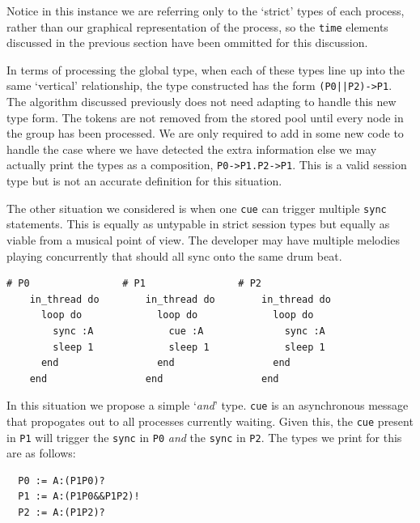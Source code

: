 \documentclass[11pt, abstracton, twoside, titlepage=true]{scrartcl}
\begin{document}
Notice in this instance we are referring only to the `strict' types of each 
process, rather than our graphical representation of the process, so the
\texttt{time} elements discussed in the previous section have been ommitted 
for this discussion.

In terms of processing the global type, when each of these types line up
into the same `vertical' relationship, the type constructed has the form 
\texttt{(P0||P2)->P1}. The algorithm discussed previously does not need
adapting to handle this new type form. The tokens are not removed from the
stored pool until every node in the group has been processed. We are only
required to add in some new code to handle the case where we have detected
the extra information else we may actually print the types as a composition,
\texttt{P0->P1.P2->P1}. This is a valid session type but is not an accurate
definition for this situation.

The other situation we considered is when one \texttt{cue} can trigger
multiple \texttt{sync} statements. This is equally as untypable in strict
session types but equally as viable from a musical point of view. The developer
may have multiple melodies playing concurrently that should all sync onto the
same drum beat.

\begin{minipage}{\textwidth}
	\begin{lstlisting}[style = sonicpi]
    # P0                # P1                # P2
    in_thread do        in_thread do        in_thread do
      loop do             loop do             loop do
        sync :A             cue :A              sync :A
        sleep 1             sleep 1             sleep 1
      end                 end                 end
    end                 end                 end
	\end{lstlisting}
\end{minipage}

In this situation we propose a simple `\emph{and}' type. \texttt{cue} is an
asynchronous message that propogates out to all processes currently waiting.
Given this, the \texttt{cue} present in \texttt{P1} will trigger the \texttt{sync}
in \texttt{P0} \emph{and} the \texttt{sync} in \texttt{P2}. The types we 
print for this are as follows:
\\
\begin{lstlisting}
  P0 := A:(P1P0)?
  P1 := A:(P1P0&&P1P2)!
  P2 := A:(P1P2)?
\end{lstlisting}
\end{document}
